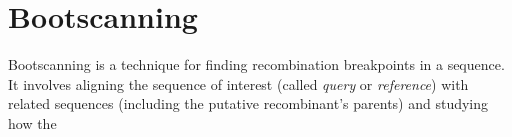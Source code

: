 \section{Bootscanning}
\label{sct_bootscanning}

Bootscanning is a technique for finding recombination breakpoints in a
sequence. It involves aligning the sequence of interest (called \emph{query}
or \emph{reference}) with related sequences (including the putative
recombinant's parents) and studying how the 
